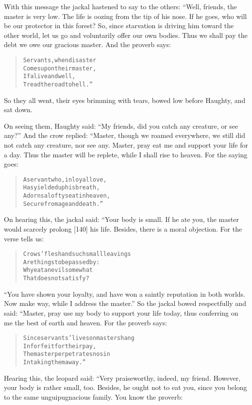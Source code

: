 \documentclass[article, twoside, 14pt]{memoir}
\renewenvironment{verbatim}{%
\begin{quote}%
\vskip -10pt%
\begin{alltt}\normalfont\large}{\end{alltt}%
\end{quote}%
\vskip -10pt
} %
\begin{document}
With this message the jackal hastened to say to the others: “Well,
friends, the master is very low. The life is oozing from the tip of
his nose. If he goes, who will be our protector in this forest? So,
since starvation is driving him toward the other world, let us go
and voluntarily offer our own bodies. Thus we shall pay the debt we
owe our gracious master. And the proverb says:

\begin{verbatim}
Servants, when disaster
Comes upon their master,
If alive and well,
Tread the road to hell.”
\end{verbatim}
So they all went, their eyes brimming with tears, bowed low before
Haughty, and sat down.

On seeing them, Haughty said:
``My friends, did you catch any creature, or see any?'' And the
crow replied: “Master, though we roamed everywhere, we still did
not catch any creature, nor see any. Master, pray eat me and
support your life for a day. Thus the master will be replete, while
I shall rise to heaven. For the saying goes:

\begin{verbatim}
A servant who, in loyal love,
Has yielded up his breath,
Adorns a lofty seat in heaven,
Secure from age and death.”
\end{verbatim}
On hearing this, the jackal said: “Your body is small. If he ate
you, the master would scarcely prolong [140] his life. Besides,
there is a moral objection. For the verse tells us:

\begin{verbatim}
Crows' flesh and such small leavings
    Are things to be passed by:
Why eat an evil somewhat
    That does not satisfy?
\end{verbatim}
``You have shown your loyalty, and have won a saintly reputation in both worlds. Now make way, while I address the master.''
So the jackal bowed respectfully and said: “Master, pray use my
body to support your life today, thus conferring on me the best of
earth and heaven. For the proverb says:

\begin{verbatim}
Since servants' lives on masters hang
    In forfeit for their pay,
The master perpetrates no sin
    In taking them away.”
\end{verbatim}
Hearing this, the leopard said: “Very praiseworthy, indeed, my
friend. However, your body is rather small, too. Besides, he ought
not to eat you, since you belong to the same unguipugnacious
family. You know the proverb:
\end{document}
